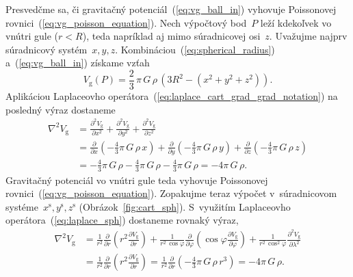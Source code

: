 \documentclass[a4paper, 12pt]{book}
\newcommand{\gidx}{\mathrm g}
\begin{document}
Presvedčme sa, či gravitačný potenciál~(\ref{eq:vg_ball_in}) vyhovuje 
Poissonovej rovnici~(\ref{eq:vg_poisson_equation}).  Nech výpočtový bod~$P$ 
leží kdekoľvek vo vnútri gule ($r < R$), teda napríklad aj mimo súradnicovej 
osi~$z$.  Uvažujme najprv súradnicový systém~$x, y, z$.  
Kombináciou~(\ref{eq:spherical_radius}) a~(\ref{eq:vg_ball_in}) získame vzťah
%
\begin{equation}
V_\gidx(P) = \frac{2}{3} \, \pi \, G \, \rho \, \left(3 R^2 - (x^2 + y^2 
+ z^2)\right){.}
\end{equation}
%
Aplikáciou Laplaceovho operátora~(\ref{eq:laplace_cart_grad_grad_notation}) na 
posledný výraz dostaneme
%
\begin{equation}
\label{eq:vg_homogeneous_ball_poisson}
\begin{split}
\nabla^2 V_\gidx &= \frac{\partial^2 V_\gidx}{\partial x^2} + \frac{\partial^2 
V_\gidx}{\partial y^2} + \frac{\partial^2 V_\gidx}{\partial z^2}\\
%
&= \frac{\partial}{\partial x} \left( -\frac{4}{3} \pi \, G \, \rho \, 
x \right) + \frac{\partial}{\partial y} \left( -\frac{4}{3} \pi \, G \, \rho \, 
y \right) + \frac{\partial}{\partial z} \left( -\frac{4}{3} \pi \, G \, \rho \, 
z \right)\\
%
&= -\frac{4}{3} \pi \, G \, \rho - \frac{4}{3} \pi \, G \, \rho - \frac{4}{3} 
\pi \, G \, \rho = -4 \pi \, G \, \rho{.}
\end{split}
\end{equation}
%
Gravitačný potenciál vo vnútri gule teda vyhovuje Poissonovej 
rovnici~(\ref{eq:vg_poisson_equation}).  Zopakujme teraz výpočet v~súradnicovom 
systéme~$x^\mathrm{s}, y^\mathrm{s}, z^\mathrm{s}$ 
(Obrázok~\ref{fig:cart_sph}).  S~využitím Laplaceovho 
operátora~(\ref{eq:laplace_sph}) dostaneme rovnaký výraz,
%
\begin{equation}
\begin{split}
\nabla^2 V_\gidx &= \frac{1}{r^2} \frac{\partial}{\partial r} \left( r^2 
\frac{\partial V_\gidx}{\partial r} \right) + \frac{1}{r^2 \, \cos\varphi} 
\frac{\partial}{\partial \varphi} \left( \cos\varphi \frac{\partial 
V_\gidx}{\partial \varphi} \right) + \frac{1}{r^2 \, 
\cos^2\varphi}\frac{\partial^2 V_\gidx}{\partial \lambda^2}\\
%
&= \frac{1}{r^2} \frac{\partial}{\partial r} \left( r^2 \frac{\partial 
V_\gidx}{\partial r} \right) = \frac{1}{r^2} \frac{\partial}{\partial r} \left( 
-\frac{4}{3} \pi \, G \, \rho \, r^3 \right) = -4 \pi \, G \, \rho{.}
\end{split}
\end{equation}
\end{document}
